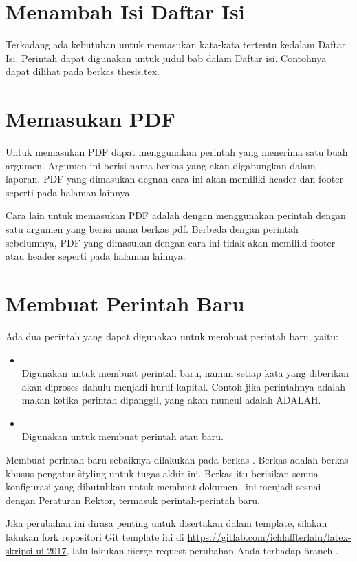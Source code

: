 \section{Menambah Isi Daftar Isi}
Terkadang ada kebutuhan untuk memasukan kata-kata tertentu kedalam Daftar Isi.
Perintah  dapat digunakan untuk judul bab dalam Daftar isi.
Contohnya dapat dilihat pada berkas thesis.tex.


\section{Memasukan PDF}
Untuk memasukan PDF dapat menggunakan perintah  yang menerima satu buah argumen.
Argumen ini berisi nama berkas yang akan digabungkan dalam laporan.
PDF yang dimasukan degnan cara ini akan memiliki header dan footer seperti pada halaman lainnya. 


Cara lain untuk memasukan PDF adalah dengan menggunakan perintah  dengan satu argumen yang berisi nama berkas pdf.
Berbeda dengan perintah sebelumnya, PDF yang dimasukan dengan cara ini tidak akan memiliki footer atau header seperti pada halaman lainnya. 



\section{Membuat Perintah Baru}
Ada dua perintah yang dapat digunakan untuk membuat perintah baru, yaitu: 
\begin{itemize}
	\item {} \\
	Digunakan untuk membuat perintah baru, namun setiap kata yang diberikan akan diproses dahulu menjadi huruf kapital. 
	Contoh jika perintahnya adalah  makan ketika perintah  dipanggil, yang akan muncul adalah ADALAH. 
	\item {} \\
	Digunakan untuk membuat perintah atau baru. 
\end{itemize}
Membuat perintah baru sebaiknya dilakukan pada berkas .
Berkas  adalah berkas khusus pengatur \f{styling} untuk tugas akhir ini.
Berkas itu berisikan semua konfigurasi yang dibutuhkan untuk membuat dokumen \latex~ini menjadi sesuai dengan Peraturan Rektor, termasuk perintah-perintah baru.

Jika perubahan ini dirasa penting untuk disertakan dalam template, silakan lakukan \f{fork} repositori Git template ini di \url{https://gitlab.com/ichlaffterlalu/latex-skripsi-ui-2017}, lalu lakukan \f{merge request} perubahan Anda terhadap \f{branch} .